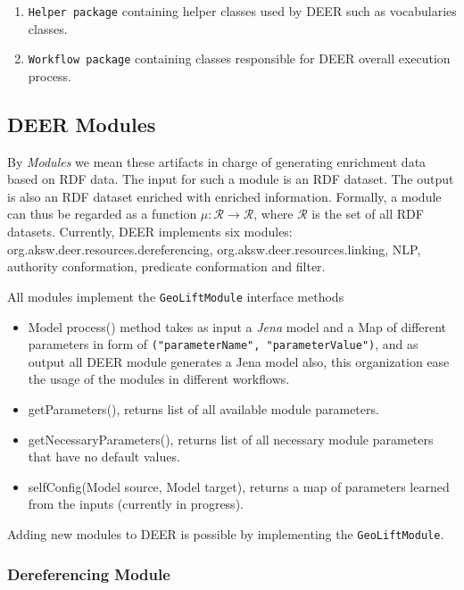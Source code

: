 \documentclass[a4paper,twoside,bibtotoc,abstracton,12pt,BCOR=15mm]{article}
\newcommand{\geolift}{\textsc{DEER}\xspace}
\begin{document}
\begin{enumerate}
  \item \texttt{Helper package} containing helper classes used by \geolift such as vocabularies classes.
  
  \item \texttt{Workflow package} containing classes responsible for \geolift overall execution process.
\end{enumerate}



\subsection{\geolift Modules}
    By \emph{Modules} we mean these artifacts in charge of generating enrichment data based on RDF data. 
    The input for such a module is an RDF dataset.
    The output is also an RDF dataset enriched with enriched information.
    Formally, a module can thus be regarded as a function $\mu: \mathcal{R} \rightarrow \mathcal{R}$, where $\mathcal{R}$ is the set of all RDF datasets.
    Currently, \geolift implements six modules: org.aksw.deer.resources.dereferencing, org.aksw.deer.resources.linking, NLP, authority conformation, predicate conformation and filter.

    All modules implement the \texttt{GeoLiftModule} interface methods 
    \begin{itemize}
      \item Model process() method takes as input a \emph{Jena} model and a Map of different parameters in form of \texttt{("parameterName", "parameterValue")},
    and as output all \geolift module generates a Jena model also, this organization ease the usage of the modules in different workflows.
      \item getParameters(), returns list of all available module parameters.
      \item getNecessaryParameters(), returns list of all necessary module parameters that have no default values.
      \item selfConfig(Model source, Model target), returns a map of parameters learned from the inputs (currently in progress).
    \end{itemize}

    Adding new modules to \geolift is possible by implementing the \texttt{GeoLiftModule}.
    \subsubsection{Dereferencing Module}
\end{document}
